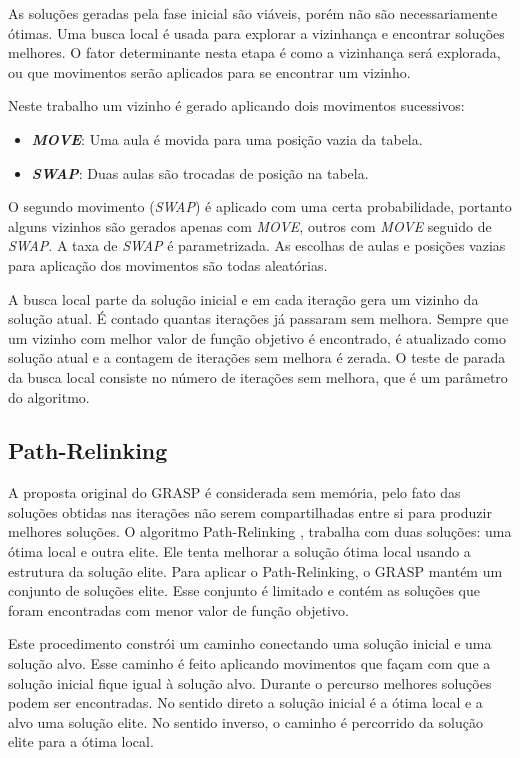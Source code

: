 \documentclass[11pt]{article}
\begin{document}
As soluções geradas pela fase inicial são viáveis, porém não são necessariamente ótimas. Uma busca local é usada para explorar a vizinhança e encontrar soluções melhores. O fator determinante nesta etapa é como a vizinhança será explorada, ou que movimentos serão aplicados para se encontrar um vizinho.

Neste trabalho um vizinho é gerado aplicando dois movimentos sucessivos:

\begin{itemize}
\item \textit{\textbf{MOVE}}: Uma aula é movida para uma posição vazia da tabela.
\item \textit{\textbf{SWAP}}: Duas aulas são trocadas de posição na tabela.
\end{itemize}

O segundo movimento (\textit{SWAP}) é aplicado com uma certa probabilidade, portanto alguns vizinhos são gerados apenas com \textit{MOVE}, outros com \textit{MOVE} seguido de \textit{SWAP}. A taxa de \textit{SWAP} é parametrizada. As escolhas de aulas e posições vazias para aplicação dos movimentos são todas aleatórias.

A busca local parte da solução inicial e em cada iteração gera um vizinho da solução atual. É contado quantas iterações já passaram sem melhora. Sempre que um vizinho com melhor valor de função objetivo é encontrado, é atualizado como solução atual e a contagem de iterações sem melhora é zerada. O teste de parada da busca local consiste no número de iterações sem melhora, que é um parâmetro do algoritmo. 

\subsection{Path-Relinking}

A proposta original do GRASP é considerada sem memória, pelo fato das soluções obtidas nas iterações não serem compartilhadas entre si para produzir melhores soluções. O algoritmo Path-Relinking \cite{Glover96tabusearch}, \cite{pathRelinking} trabalha com duas soluções: uma ótima local e outra elite. Ele tenta melhorar a solução ótima local usando a estrutura da solução elite. Para aplicar o Path-Relinking, o GRASP mantém um conjunto de soluções elite. Esse conjunto é limitado e contém as soluções que foram encontradas com menor valor de função objetivo.

Este procedimento constrói um caminho conectando uma solução inicial e uma solução alvo. Esse caminho é feito aplicando movimentos que façam com que a solução inicial fique igual à solução alvo. Durante o percurso melhores soluções podem ser encontradas. No sentido direto a solução inicial é a ótima local e a alvo uma solução elite. No sentido inverso, o caminho é percorrido da solução elite para a ótima local.
\end{document}
